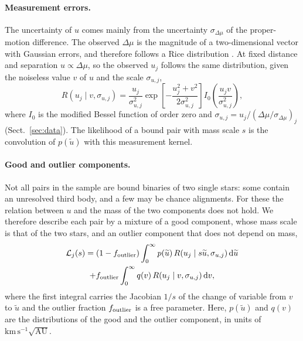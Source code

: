 \documentclass{aa}
\newcommand{\kmsau}{\mathrm{km}\,\mathrm{s}^{-1}\sqrt{\mathrm{AU}}}
\newcommand{\dd}{\,\mathrm{d}}
\begin{document}
\paragraph{Measurement errors.} The uncertainty of $u$ comes mainly from the uncertainty $\sigma_{\Delta\mu}$ of the proper-motion difference. The observed $\Delta\mu$ is the magnitude of a two-dimensional vector with Gaussian errors, and therefore follows a Rice distribution \citep{Rice1945}. At fixed distance and separation $u\propto\Delta\mu$, so the observed $u_j$ follows the same distribution, given the noiseless value $v$ of $u$ and the scale $\sigma_{u,j}$,
\begin{equation}
 R(u_j\mid v,\sigma_{u,j})=\frac{u_j}{\sigma_{u,j}^2}\exp\!\left[-\frac{u_j^2+v^2}{2\sigma_{u,j}^2}\right]I_0\!\left(\frac{u_jv}{\sigma_{u,j}^2}\right),
 \label{eq:rice}
\end{equation}
where $I_0$ is the modified Bessel function of order zero and $\sigma_{u,j}=u_j/(\Delta\mu/\sigma_{\Delta\mu})_j$ (Sect.~\ref{sec:data}). The likelihood of a bound pair with mass scale $s$ is the convolution of $p(\widetilde u)$ with this measurement kernel.

\paragraph{Good and outlier components.} Not all pairs in the sample are bound binaries of two single stars: some contain an unresolved third body, and a few may be chance alignments. For these the relation between $u$ and the mass of the two components does not hold. We therefore describe each pair by a mixture of a good component, whose mass scale is that of the two stars, and an outlier component that does not depend on mass,
\begin{multline}
 \mathcal L_j(s)=(1-f_{\rm outlier})\int_0^{\infty}p(\widetilde u)\,R(u_j\mid s\widetilde u,\sigma_{u,j})\dd\widetilde u\\+f_{\rm outlier}\int_0^{\infty}q(v)\,R(u_j\mid v,\sigma_{u,j})\dd v,
 \label{eq:mixture}
\end{multline}
where the first integral carries the Jacobian $1/s$ of the change of variable from $v$ to $\widetilde u$ and the outlier fraction $f_{\rm outlier}$ is a free parameter. Here, $p(\widetilde u)$ and $q(v)$ are the distributions of the good and the outlier component, in units of $\kmsau$.
\end{document}
